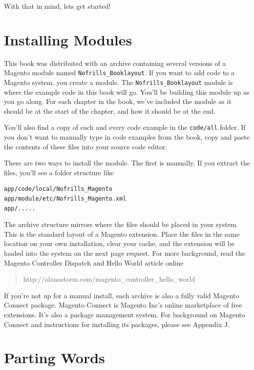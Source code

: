 \documentclass[oneside]{book}
\begin{document}
With that in mind, lets get started!

\section{Installing Modules}

This book was distributed with an archive containing several versions of a Magento module named \footnotesize\texttt{Nofrills\_Booklayout}\normalsize.  If you want to add code to a Magento system, you create a module.  The \footnotesize\texttt{Nofrills\_Booklayout} \normalsize  module is where the example code in this book will go.  You'll be building this module up as you go along.  For each chapter in the book, we've included the module as it should be at the start of the chapter, and how it should be at the end.

You'll also find a copy of each and every code example in the \footnotesize\texttt{code/all} \normalsize  folder. If you don't want to manually type in code examples from the book, copy and paste the contents of these files into your source code editor.

There are two ways to install the module.  The first is manually.  If you extract the files, you'll see a folder structure like

\begin{lstlisting}
app/code/local/Nofrills_Magento
app/module/etc/Nofrills_Magento.xml
app/.....

\end{lstlisting}


The archive structure mirrors where the files should be placed in your system.  This is the standard layout of a Magento extension.  Place the files in the same location on your own installation, clear your cache, and the extension will be loaded into the system on the next page request. For more background, read the Magento Controller Dispatch and Hello World article online

\begin{quote}
http://alanastorm.com/magento\_controller\_hello\_world
\end{quote}

If you're not up for a manual install, each archive is also a fully valid Magento Connect package.  Magento Connect is Magento Inc's online marketplace of free extensions.  It's also a package management system.  For background on Magento Connect and instructions for installing its packages, please see Appendix J.

\section{Parting Words}
\end{document}
